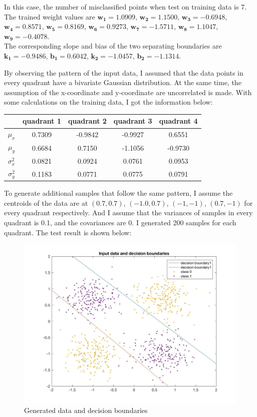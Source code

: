 \documentclass[a4paper]{article}
\begin{document}
\begin{spacing}{2.0}
\begin{itemize}
In this case, the number of misclassified points when test on training data is 7. The trained weight values are
$\mathbf{w_1 = 1.0909}$, $\mathbf{w_2 = 1.1500}$, $\mathbf{w_3 = -0.6948}$, $\mathbf{w_4 = 0.8571}$, $\mathbf{w_5 = 0.8169}$, $\mathbf{w_6 = 0.9273}$, $\mathbf{w_7 = -1.5711}$, $\mathbf{w_8 = 1.1047}$, $\mathbf{w_9 = -0.4078}$.\\
The corresponding slope and bias of the two separating boundaries are $\mathbf{k_1 = -0.9486}$, $\mathbf{b_1 = 0.6042}$, $\mathbf{k_2 = -1.0457}$, $\mathbf{b_2 = -1.1314}$. 
 
By observing the pattern of the input data, I assumed that the data points in every quadrant have a bivariate Gaussian distribution. At the same time, the assumption of the x-coordinate and y-coordinate are uncorrelated is made.  With some calculations on the training data, I got the information below:

\begin{table}[htbp]
\centering
\begin{tabular}{|c|c|c|c|c|}
\hline
\ \ & quadrant 1 & quadrant 2 & quadrant 3 & quadrant 4\\
\hline
$\mu_x $ & 0.7309 & -0.9842 & -0.9927 & 0.6551\\
\hline
$\mu_y $ & 0.6684 & 0.7150 & -1.1056 & -0.9730\\
\hline
$\sigma_x^2 $ & 0.0821 & 0.0924 & 0.0761 & 0.0953\\
\hline
$\sigma_y^2 $ & 0.1183 & 0.0771 & 0.0775& 0.0791\\
\hline
\end{tabular}
\end{table}

To generate additional samples that follow the same pattern, I assume the centroids of the data are at $(0.7, 0.7)$, $(-1.0, 0.7)$, $(-1, -1)$, $(0.7, -1)$ for every quadrant respectively. And I assume that the variances of samples in every quadrant is 0.1, and the covariances are 0. I generated 200 samples for each quadrant. The test result is shown below:
\begin{figure}[H]
\centering
\includegraphics[width = 4.5in]{inputDBtest.jpg}
\caption{Generated data and decision boundaries}
\label{inputDB_test}
\end{figure}


\end{itemize}
\end{spacing}
\end{document}

